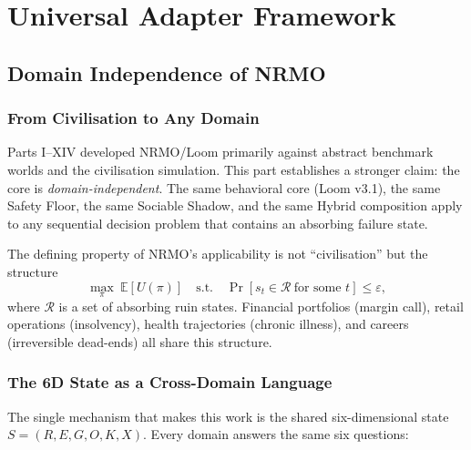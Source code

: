 
\part{Universal Adapter Framework}
\label{part:universal_adapter}

\chapter{Domain Independence of NRMO}
\label{ch:domain_independence}

\section{From Civilisation to Any Domain}

Parts I--XIV developed NRMO/Loom primarily against abstract benchmark
worlds and the civilisation simulation. This part establishes a
stronger claim: the core is \emph{domain-independent}. The same
behavioral core (Loom v3.1), the same Safety Floor, the same Sociable
Shadow, and the same Hybrid composition apply to any sequential
decision problem that contains an absorbing failure state.

The defining property of NRMO's applicability is not ``civilisation''
but the structure
\begin{equation}
\max_{\pi}\ \mathbb{E}[U(\pi)]
\quad\text{s.t.}\quad
\Pr[s_t \in \mathcal{R}\ \text{for some } t] \le \varepsilon,
\end{equation}
where $\mathcal{R}$ is a set of absorbing ruin states. Financial
portfolios (margin call), retail operations (insolvency), health
trajectories (chronic illness), and careers (irreversible dead-ends)
all share this structure.

\section{The 6D State as a Cross-Domain Language}

The single mechanism that makes this work is the shared
six-dimensional state $S=(R,E,G,O,K,X)$. Every domain answers the same
six questions:

